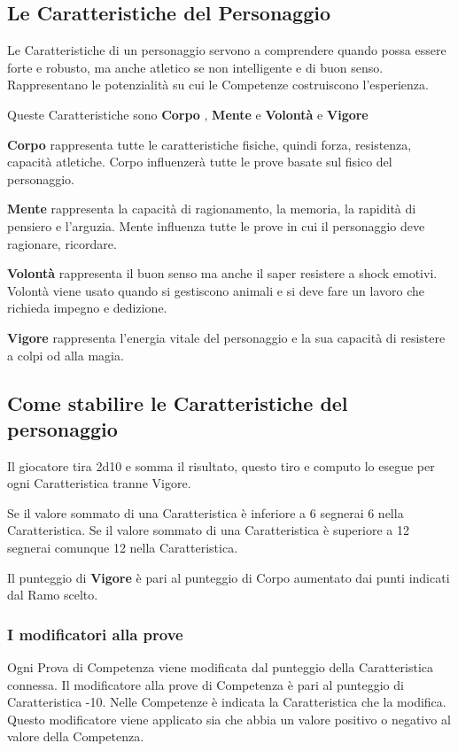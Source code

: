 \documentclass[12pt,a4paper,twoside,openany]{book}
\begin{document}
\begin{multicols}{2}

\subsection{Le Caratteristiche del Personaggio}

Le Caratteristiche di un personaggio servono a comprendere quando possa essere forte e robusto, ma anche atletico se non intelligente e di buon senso. Rappresentano le potenzialità su cui le Competenze costruiscono l'esperienza.

Queste Caratteristiche sono \textbf{Corpo} , \textbf{Mente}  e \textbf{Volontà}  e \textbf{Vigore}

\textbf{Corpo} rappresenta tutte le caratteristiche fisiche, quindi forza, resistenza, capacità atletiche. Corpo influenzerà tutte le prove basate sul fisico del personaggio.

\textbf{Mente} rappresenta la capacità di ragionamento, la memoria, la rapidità di pensiero e l'arguzia. Mente influenza tutte le prove in cui il personaggio deve ragionare, ricordare.

\textbf{Volontà} rappresenta il buon senso ma anche il saper resistere a shock emotivi. Volontà viene usato quando si gestiscono animali e si deve fare un lavoro che richieda impegno e dedizione.

\textbf{Vigore} rappresenta l'energia vitale del personaggio e la sua capacità di resistere a colpi od alla magia.

\subsection{Come stabilire le Caratteristiche del personaggio}

Il giocatore tira 2d10 e somma il risultato, questo tiro e computo lo esegue per ogni Caratteristica tranne Vigore.

Se il valore sommato di una Caratteristica è inferiore a 6 segnerai 6 nella Caratteristica. Se il valore sommato di una Caratteristica è superiore a 12 segnerai comunque 12 nella Caratteristica.

Il punteggio di \textbf{Vigore} è pari al punteggio di Corpo aumentato dai punti indicati dal Ramo scelto.

\subsubsection{I modificatori alla prove}

Ogni Prova di Competenza viene modificata dal punteggio della Caratteristica connessa. 
Il modificatore alla prove di Competenza è pari al punteggio di Caratteristica -10. Nelle Competenze è indicata la Caratteristica che la modifica. Questo modificatore viene applicato sia che abbia un valore positivo o negativo al valore della Competenza.

\end{multicols}
\end{document}
